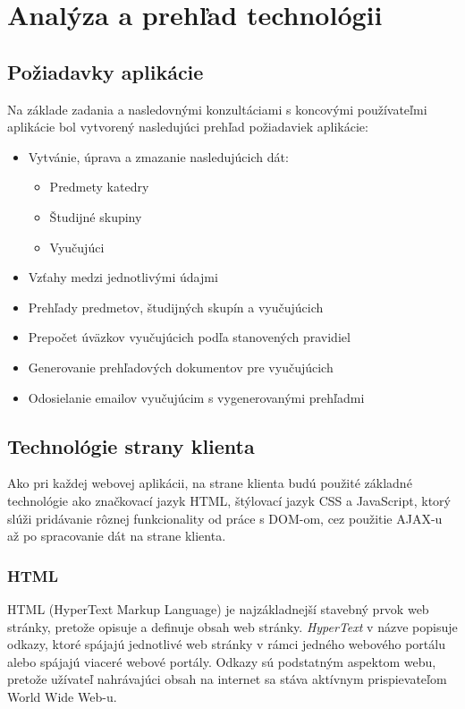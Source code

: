 \chapter{Analýza a prehľad technológii}

\section{Požiadavky aplikácie}

Na základe zadania a nasledovnými konzultáciami s koncovými používateľmi aplikácie bol vytvorený nasledujúci prehľad požiadaviek aplikácie:

\begin{itemize}
    \item Vytvánie, úprava a zmazanie nasledujúcich dát:
        \begin{itemize}
            \item Predmety katedry
            \item Študijné skupiny
            \item Vyučujúci
        \end{itemize}
    \item Vzťahy medzi jednotlivými údajmi
    \item Prehľady predmetov, študijných skupín a vyučujúcich
    \item Prepočet úväzkov vyučujúcich podľa stanovených pravidiel
    \item Generovanie prehľadových dokumentov pre vyučujúcich
    \item Odosielanie emailov vyučujúcim s vygenerovanými prehľadmi
\end{itemize}

\section{Technológie strany klienta}
Ako pri každej webovej aplikácii, na strane klienta budú použité základné technológie ako značkovací jazyk HTML, štýlovací jazyk CSS a JavaScript, ktorý slúži pridávanie rôznej funkcionality od práce s DOM-om, cez použitie AJAX-u až po spracovanie dát na strane klienta.

\subsection*{HTML}

HTML (HyperText Markup Language) je najzákladnejší stavebný prvok web stránky, pretože opisuje a definuje obsah web stránky. \emph{HyperText} v názve popisuje odkazy, ktoré spájajú jednotlivé web stránky v rámci jedného webového portálu alebo spájajú viaceré webové portály. Odkazy sú podstatným aspektom webu, pretože užívateľ nahrávajúci obsah na internet sa stáva aktívnym prispievateľom World Wide Web-u.

